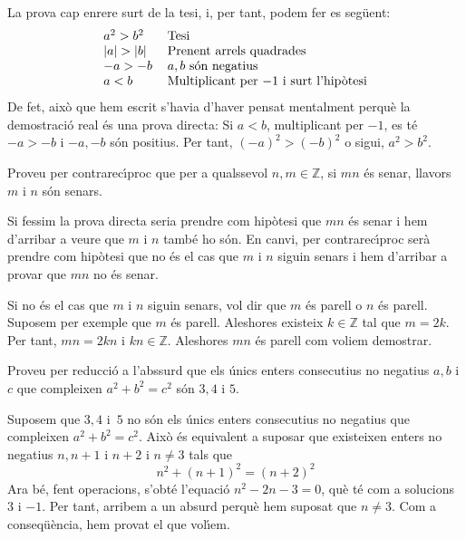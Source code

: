 \begin{solucio}
La prova cap enrere surt de la tesi, i, per tant, podem fer es seg\"{u}ent:%
\[%
\begin{tabular}
[c]{ll}%
$a^{2}>b^{2}$ & Tesi\\
$\left\vert a\right\vert >\left\vert b\right\vert $ & Prenent arrels
quadrades\\
$-a>-b$ & $a,b$ s\'{o}n negatius\\
$a<b$ & Multiplicant per $-1$ i surt l'hip\`{o}tesi
\end{tabular}
\]
De fet, aix\`{o} que hem escrit s'havia d'haver pensat mentalment perqu\`{e}
la demostraci\'{o} real \'{e}s una prova directa: Si $a<b$, multiplicant per
$-1$, es t\'{e} $-a>-b$ i $-a,-b$ s\'{o}n positius. Per tant, $\left(
-a\right)  ^{2}>(-b)^{2}$ o sigui, $a^{2}>b^{2}$.
\end{solucio}

\begin{exer}
Proveu per contrarec\'{\i}proc que per a qualssevol $n,m\in\mathbb{Z}$, si
$mn$ \'{e}s senar, llavors $m$ i $n$ s\'{o}n senars.
\end{exer}

\begin{solucio}
Si fessim la prova directa seria prendre com hip\`{o}tesi que $mn$ \'{e}s
senar i hem d'arribar a veure que $m$ i $n$ tamb\'{e} ho s\'{o}n. En canvi,
per contrarec\'{\i}proc ser\`{a} prendre com hip\`{o}tesi que no \'{e}s el cas
que $m$ i $n$ siguin senars i hem d'arribar a provar que $mn$ no \'{e}s senar.

Si no \'{e}s el cas que $m$ i $n$ siguin senars, vol dir que $m$ \'{e}s parell
o $n$ \'{e}s parell. Suposem per exemple que $m$ \'{e}s parell. Aleshores
existeix $k\in\mathbb{Z}$ tal que $m=2k$. Per tant, $mn=2kn$ i $kn\in
\mathbb{Z}$. Aleshores $mn$ \'{e}s parell com voliem demostrar.
\end{solucio}

\begin{exer}
Proveu per reducci\'{o} a l'abssurd que els \'{u}nics enters consecutius no
negatius $a,b$ i $c$ que compleixen $a^{2}+b^{2}=c^{2}$ s\'{o}n $3,4$ i $5$.
\end{exer}

\begin{solucio}
Suposem que $3,4$ i~$5$ no s\'{o}n els \'{u}nics enters consecutius no
negatius que compleixen $a^{2}+b^{2}=c^{2}$. Aix\`{o} \'{e}s equivalent a
suposar que existeixen enters no negatius $n,n+1$ i $n+2$ i $n\neq3$ tals que%
\[
n^{2}+(n+1)^{2}=(n+2)^{2}%
\]
Ara b\'{e}, fent operacions, s'obt\'{e} l'equaci\'{o} $n^{2}-2n-3=0$, qu\`{e}
t\'{e} com a solucions $3$ i $-1$. Per tant, arribem a un absurd perqu\`{e}
hem suposat que $n\neq3$. Com a conseq\"{u}\`{e}ncia, hem provat el que vol\'{\i}em.
\end{solucio}


